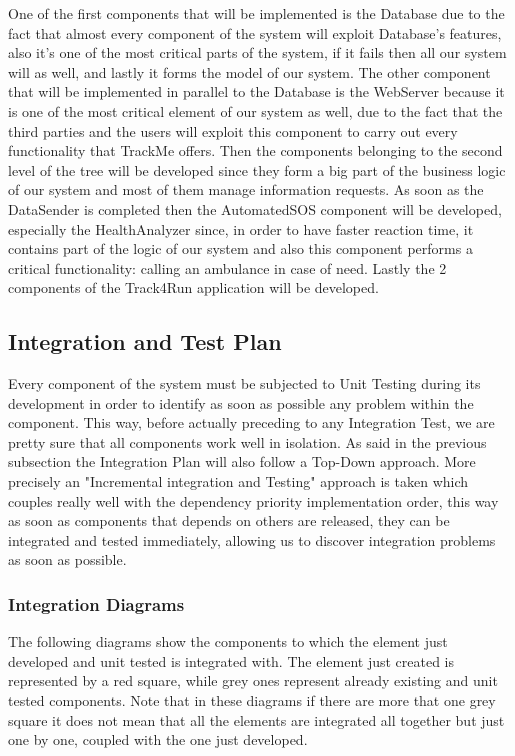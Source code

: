 \noindent
One of the first components that will be implemented is the Database due to the fact that almost every component of the system will exploit Database's features, also it's one of the most critical parts of the system, if it fails then all our system will as well, and lastly it forms the model of our system.
\medbreak
\noindent
The other component that will be implemented in parallel to the Database is the WebServer because it is one of the most critical element of our system as well, due to the fact that the third parties and the users will exploit this component to carry out every functionality that TrackMe offers.
\medbreak
\noindent
Then the components belonging to the second level of the tree will be developed since they form a big part of the business logic of our system and most of them manage information requests.
\medbreak
\noindent
As soon as the DataSender is completed then the AutomatedSOS component will be developed, especially the HealthAnalyzer since, in order to have faster reaction time, it contains part of the logic of our system and also this component performs a critical functionality: calling an ambulance in case of need.
\medbreak
\noindent
Lastly the 2 components of the Track4Run application will be developed.

\subsection{Integration and Test Plan}
Every component of the system must be subjected to Unit Testing during its development in order to identify as soon as possible any problem within the component. This way, before actually preceding to any Integration Test, we are pretty sure that all components work well in isolation.
\medbreak
\noindent
As said in the previous subsection the Integration Plan will also follow a Top-Down approach. More precisely an "Incremental integration and Testing" approach is taken which couples really well with the dependency priority implementation order, this way as soon as components that depends on others are released, they can be integrated and tested immediately, allowing us to discover integration problems as soon as possible.

\subsubsection{Integration Diagrams}
The following diagrams show the components to which the element just developed and unit tested is integrated with. The element just created is represented by a red square, while grey ones represent already existing and unit tested components. Note that in these diagrams if there are more that one grey square it does not mean that all the elements are integrated all together but just one by one, coupled with the one just developed.


